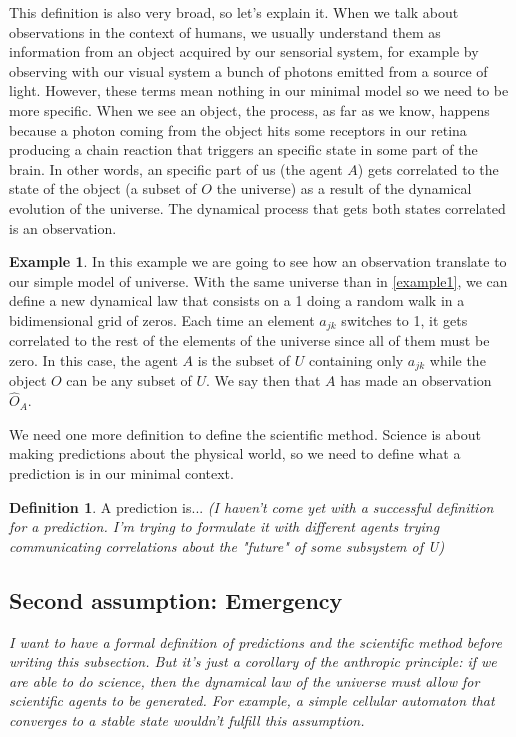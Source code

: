 \documentclass[11pt,a4paper,twoside]{report}
\newcommand{\+}{\textnormal{+} }
\theoremstyle{definition}
\newtheorem{mydef}[mythm]{Definition}
\newtheorem{myex}[mythm]{Example}
\numberwithin{equation}{chapter}
\begin{document}
This definition is also very broad, so let's explain it. When we talk about 
observations in the context of humans, we usually understand them as information
from an object acquired by our sensorial system, for example by observing with
our visual system a bunch of photons emitted from a source of light. However, 
these terms mean nothing in our minimal model so we need to be more specific.
When we see an object, the process, as far as we know, happens because a 
photon coming from the object hits some receptors in our retina producing a 
chain reaction that triggers an specific state in some part of the brain. In 
other words, an specific part of us (the agent $A$) gets correlated to the state
of the object (a subset of $O$ the universe) as a result of the dynamical 
evolution of the universe. The dynamical process that gets both states 
correlated is an observation.

\begin{myex}
  In this example we are going to see how an observation translate to our
  simple model of universe. With the same universe than in \ref{example1}, we 
  can define a new dynamical law that consists on a 1 doing a random walk 
  in a bidimensional grid of zeros. Each time an element $a_{jk}$ switches to 
  1, it gets correlated to the rest of the elements of the universe since 
  all of them must be zero. In this case, the agent $A$ is the subset of $U$ 
  containing only $a_{jk}$ while the object $O$ can be any subset of $U$.
  We say then that $A$ has made an observation $\hat{O}_{A}$.
\end{myex}

We need one more definition to define the scientific method. Science is about
making predictions about the physical world, so we need to define what 
a prediction is in our minimal context.



\begin{mydef}
  A prediction is... \textit{(I haven't come yet with a successful definition
  for a prediction. I'm trying to formulate it with different agents trying 
  communicating correlations about the "future" of some subsystem of U)}
\end{mydef}

\subsection{Second assumption: Emergency}
\textit{I want to have a formal definition of predictions and the scientific
method before writing this subsection. But it's just a corollary of the anthropic
principle: if we are able to do science, then the dynamical law of the universe
must allow for scientific agents to be generated. For example, a simple cellular
automaton that converges to a stable state wouldn't fulfill this assumption.}
\end{document}
